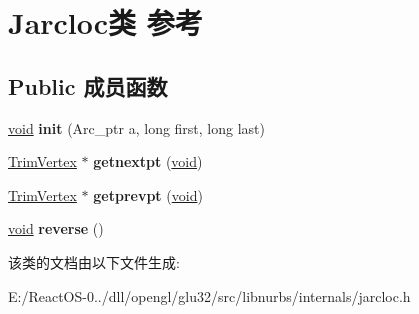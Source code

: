 \hypertarget{class_jarcloc}{}\section{Jarcloc类 参考}
\label{class_jarcloc}
\subsection*{Public 成员函数}
\begin{DoxyCompactItemize}
\item 
\mbox{\label{class_jarcloc_a753e240834beb89bc363c9570eeb6aa8}} 
\hyperlink{interfacevoid}{void} {\bfseries init} (Arc\+\_\+ptr a, long first, long last)
\item 
\mbox{\label{class_jarcloc_aeee5d930d89e95fc6f42c8c58658a1c9}} 
\hyperlink{class_trim_vertex}{Trim\+Vertex} $\ast$ {\bfseries getnextpt} (\hyperlink{interfacevoid}{void})
\item 
\mbox{\label{class_jarcloc_ab96f72acd0ab19a3cb1d8204758ee6f3}} 
\hyperlink{class_trim_vertex}{Trim\+Vertex} $\ast$ {\bfseries getprevpt} (\hyperlink{interfacevoid}{void})
\item 
\mbox{\label{class_jarcloc_aa63502b2d8ea38529c38125e5edeec12}} 
\hyperlink{interfacevoid}{void} {\bfseries reverse} ()
\end{DoxyCompactItemize}


该类的文档由以下文件生成\+:\begin{DoxyCompactItemize}
\item 
E\+:/\+React\+O\+S-\/0../dll/opengl/glu32/src/libnurbs/internals/jarcloc.\+h\end{DoxyCompactItemize}
